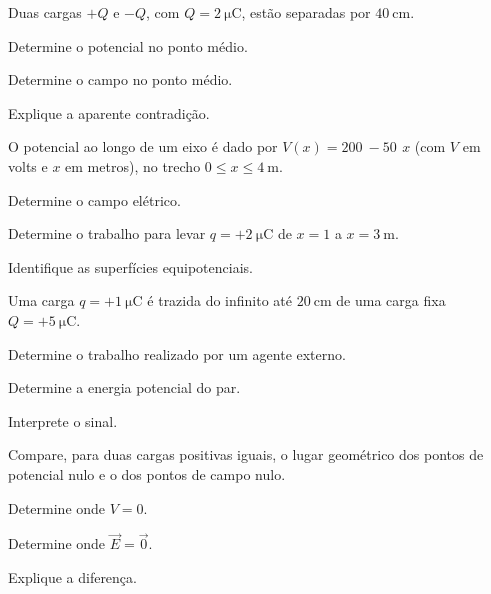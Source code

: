 \blocoaprofundamento
\begin{questao}[3]{}

Duas cargas $+Q$ e $-Q$, com $Q=\SI{2}{\micro\coulomb}$, estão separadas por
$\SI{40}{\centi\meter}$.
\begin{itensq}
\item Determine o potencial no ponto médio.
\item Determine o campo no ponto médio.
\item Explique a aparente contradição.
\end{itensq}


\end{questao}
\begin{questao}[3]{}

O potencial ao longo de um eixo é dado por
$V(x)=\SI{200}{}-\SI{50}{}\,x$ (com $V$ em volts e $x$ em metros), no trecho
$0\le x\le\SI{4}{\meter}$.
\begin{itensq}
\item Determine o campo elétrico.
\item Determine o trabalho para levar $q=+\SI{2}{\micro\coulomb}$ de
      $x=1$ a $x=\SI{3}{\meter}$.
\item Identifique as superfícies equipotenciais.
\end{itensq}


\end{questao}
\begin{questao}[3]{}

Uma carga $q=+\SI{1}{\micro\coulomb}$ é trazida do infinito até
$\SI{20}{\centi\meter}$ de uma carga fixa $Q=+\SI{5}{\micro\coulomb}$.
\begin{itensq}
\item Determine o trabalho realizado por um agente externo.
\item Determine a energia potencial do par.
\item Interprete o sinal.
\end{itensq}


\end{questao}
\begin{questao}[3]{}

Compare, para duas cargas positivas iguais, o lugar geométrico dos pontos de
potencial nulo e o dos pontos de campo nulo.
\begin{itensq}
\item Determine onde $V=0$.
\item Determine onde $\vec E=\vec 0$.
\item Explique a diferença.
\end{itensq}


\end{questao}

